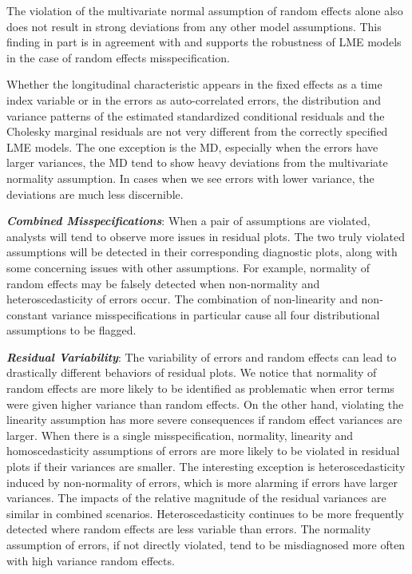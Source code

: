 \documentclass[12pt]{article}
\begin{document}
The violation of the multivariate normal assumption of random effects
alone also does not result in strong deviations from any other model
assumptions. This finding in part is in agreement with
\citet{Schielzeth2020-gp} and supports the robustness of LME models in
the case of random effects misspecification.

Whether the longitudinal characteristic appears in the fixed effects as
a time index variable or in the errors as auto-correlated errors, the
distribution and variance patterns of the estimated standardized
conditional residuals and the Cholesky marginal residuals are not very
different from the correctly specified LME models. The one exception is
the MD, especially when the errors have larger variances, the MD tend to
show heavy deviations from the multivariate normality assumption. In
cases when we see errors with lower variance, the deviations are much
less discernible.

\textbf{\emph{Combined Misspecifications}}: When a pair of assumptions
are violated, analysts will tend to observe more issues in residual
plots. The two truly violated assumptions will be detected in their
corresponding diagnostic plots, along with some concerning issues with
other assumptions. For example, normality of random effects may be
falsely detected when non-normality and heteroscedasticity of errors
occur. The combination of non-linearity and non-constant variance
misspecifications in particular cause all four distributional
assumptions to be flagged.

\textbf{\emph{Residual Variability}}: The variability of errors and
random effects can lead to drastically different behaviors of residual
plots. We notice that normality of random effects are more likely to be
identified as problematic when error terms were given higher variance
than random effects. On the other hand, violating the linearity
assumption has more severe consequences if random effect variances are
larger. When there is a single misspecification, normality, linearity
and homoscedasticity assumptions of errors are more likely to be
violated in residual plots if their variances are smaller. The
interesting exception is heteroscedasticity induced by non-normality of
errors, which is more alarming if errors have larger variances. The
impacts of the relative magnitude of the residual variances are similar
in combined scenarios. Heteroscedasticity continues to be more
frequently detected where random effects are less variable than errors.
The normality assumption of errors, if not directly violated, tend to be
misdiagnosed more often with high variance random effects.
\end{document}
